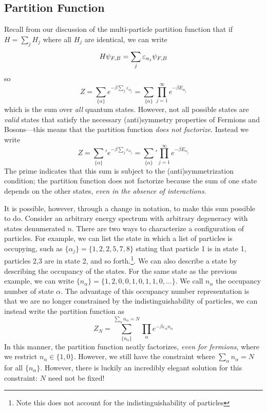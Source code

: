 \subsection{Partition Function}
Recall from our discussion of the multi-particle partition function that if \(H =\sum_j H_j\) where all \(H_j\) are identical, we can write
\[H\psi_{F,B} = \sum_j \varepsilon_{\alpha_j}\psi_{F,B}\]
so
\[Z = \sum_{\{\alpha\}} e^{-\beta \sum_j\varepsilon_{\alpha_j}} = \sum_{\{\alpha\}}\prod_{j=1}^\infty e^{-\beta E_{\alpha_j}}\]
which is the sum over \emph{all} quantum states. However, not all possible states are \emph{valid} states that satisfy the necessary (anti)symmetry properties of Fermions and Bosons---this means that the partition function \emph{does not factorize}. Instead we write
\[Z = \left.\sum_{\{\alpha\}}\right.' e^{-\beta \sum_j\varepsilon_{\alpha_j}} = \left.\sum_{\{\alpha\}}\right.'\prod_{j=1}^\infty e^{-\beta E_{\alpha_j}}\]
The prime indicates that this sum is subject to the (anti)symmetrization condition; the partition function does not factorize because the sum of one state depends on the other states, \emph{even in the absence of interactions}.

It is possible, however, through a change in notation, to make this sum possible to do. Consider an arbitrary energy spectrum with arbitrary degeneracy with states denumerated \(n\). There are two ways to characterize a configuration of particles. For example, we can list the state in which a list of particles is occupying, such as \(\{\alpha_j\}=\{1,2,2,5,7,8\}\) stating that particle 1 is in state 1, particles 2,3 are in state 2, and so forth.\footnote{Note this does not account for the indistinguishability of particles}. We can also describe a state by describing the occupancy of the states. For the same state as the previous example, we can write \(\{n_\alpha\} = \{1,2,0,0,1,0,1,1,0,\dots\}\). We call \(n_\alpha\) the occupancy number of state \(\alpha\). The advantage of this occupancy number representation is that we are no longer constrained by the indistinguishability of particles, we can instead write the partition function as
\begin{equation}
	Z_N = \sum_{\{n_\alpha\}}^{\sum_\alpha n_\alpha = N}\prod_{\alpha} e^{-\beta \varepsilon_\alpha n_\alpha}
\end{equation}
In this manner, the partition function neatly factorizes, \emph{even for fermions}, where we restrict \(n_\alpha \in \{1,0\}\). However, we still have the constraint where \(\sum_\alpha n_\alpha = N\) for all \(\{n_\alpha\}\). However, there is luckily an incredibly elegant solution for this constraint: \(N\) need not be fixed!

